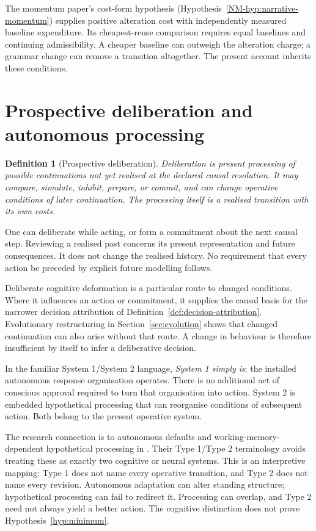 \documentclass[11pt,a4paper]{article}
\newtheorem{definition}{Definition}[section]
\theoremstyle{remark}
\begin{document}
The momentum paper's cost-form hypothesis
(Hypothesis~\ref{NM-hyp:narrative-momentum}) supplies positive alteration
cost with independently measured baseline expenditure. Its cheapest-reuse
comparison requires equal baselines and continuing admissibility. A cheaper
baseline can outweigh the alteration charge; a grammar change can remove a
transition altogether. The present account inherits these conditions.

\section{Prospective deliberation and autonomous processing}\label{sec:prospective}

\begin{definition}[Prospective deliberation]\label{def:prospective}
Deliberation is present processing of possible continuations not yet realised
at the declared causal resolution. It may compare, simulate, inhibit,
prepare, or commit, and can change operative conditions of later continuation.
The processing itself is a realised transition with its own costs.
\end{definition}

One can deliberate while acting, or form a commitment about the next causal
step. Reviewing a realised past concerns its present representation and future
consequences. It does not change the realised history. No requirement that
every action be preceded by explicit future modelling follows.

Deliberate cognitive deformation is a particular route to changed conditions.
Where it influences an action or commitment, it supplies the causal basis for
the narrower decision attribution of Definition~\ref{def:decision-attribution}.
Evolutionary restructuring in Section~\ref{sec:evolution} shows that changed
continuation can also arise without that route. A change in behaviour is
therefore insufficient by itself to infer a deliberative decision.

In the familiar System 1/System 2 language, \emph{System 1 simply is}: the
installed autonomous response organisation operates. There is no additional
act of conscious approval required to turn that organisation into action.
System 2 is embedded hypothetical processing that can reorganise conditions
of subsequent action. Both belong to the present operative system.

The research connection is to autonomous defaults and working-memory-dependent
hypothetical processing in \citet{evansstanovich2013}. Their Type 1/Type 2
terminology avoids treating these as exactly two cognitive or neural systems.
This is an interpretive mapping: Type 1 does not name every operative
transition, and Type 2 does not name every revision. Autonomous adaptation
can alter standing structure; hypothetical processing can fail to redirect
it. Processing can overlap, and Type 2 need not always yield a better action.
The cognitive distinction does not prove Hypothesis~\ref{hyp:minimum}.
\end{document}
